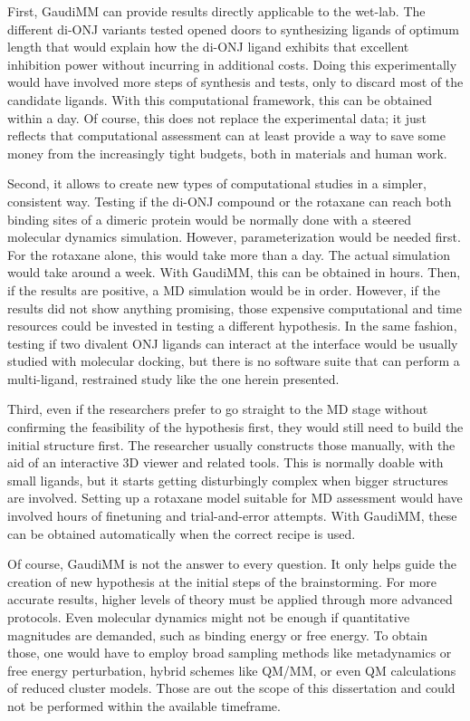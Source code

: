 First, GaudiMM can provide results directly applicable to the wet-lab. The different di-ONJ variants tested opened doors to synthesizing ligands of optimum length that would explain how the di-ONJ ligand exhibits that excellent inhibition power without incurring in additional costs. Doing this experimentally would have involved more steps of synthesis and tests, only to discard most of the candidate ligands. With this computational framework, this can be obtained within a day. Of course, this does not replace the experimental data; it just reflects that computational assessment can at least provide a way to save some money from the increasingly tight budgets, both in materials and human work.

Second, it allows to create new types of computational studies in a simpler, consistent way. Testing if the di-ONJ compound or the rotaxane can reach both binding sites of a dimeric protein would be normally done with a steered molecular dynamics simulation. However, parameterization would be needed first. For the rotaxane alone, this would take more than a day. The actual simulation would take around a week. With GaudiMM, this can be obtained in hours. Then, if the results are positive, a MD simulation would be in order. However, if the results did not show anything promising, those expensive computational and time resources could be invested in testing a different hypothesis. In the same fashion, testing if two divalent ONJ ligands can interact at the interface would be usually studied with molecular docking, but there is no software suite that can perform a multi-ligand, restrained study like the one herein presented.

Third, even if the researchers prefer to go straight to the MD stage without confirming the feasibility of the hypothesis first, they would still need to build the initial structure first. The researcher usually constructs those manually, with the aid of an interactive 3D viewer and related tools. This is normally doable with small ligands, but it starts getting disturbingly complex when bigger structures are involved. Setting up a rotaxane model suitable for MD assessment would have involved hours of finetuning and trial-and-error attempts. With GaudiMM, these can be obtained automatically when the correct recipe is used.

Of course, GaudiMM is not the answer to every question. It only helps guide the creation of new hypothesis at the initial steps of the brainstorming. For more accurate results, higher levels of theory must be applied through more advanced protocols. Even molecular dynamics might not be enough if quantitative magnitudes are demanded, such as binding energy or free energy. To obtain those, one would have to employ broad sampling methods like metadynamics or free energy perturbation, hybrid schemes like QM/MM, or even QM calculations of reduced cluster models. Those are out the scope of this dissertation and could not be performed within the available timeframe.

